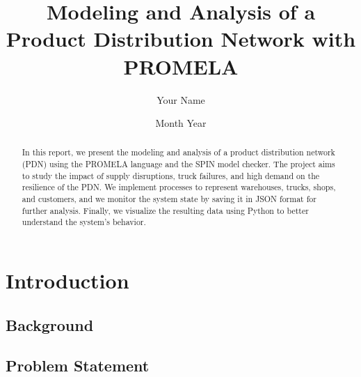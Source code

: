 \documentclass[12pt]{report}
\title{Modeling and Analysis of a Product Distribution Network with PROMELA}
\author{Your Name}
\date{Month Year}
\begin{document}
\maketitle

\begin{abstract}
In this report, we present the modeling and analysis of a product distribution network (PDN) using the PROMELA language and the SPIN model checker. The project aims to study the impact of supply disruptions, truck failures, and high demand on the resilience of the PDN. We implement processes to represent warehouses, trucks, shops, and customers, and we monitor the system state by saving it in JSON format for further analysis. Finally, we visualize the resulting data using Python to better understand the system's behavior.
\end{abstract}

\tableofcontents

\chapter{Introduction}
\section{Background}
\section{Problem Statement}
\end{document}
